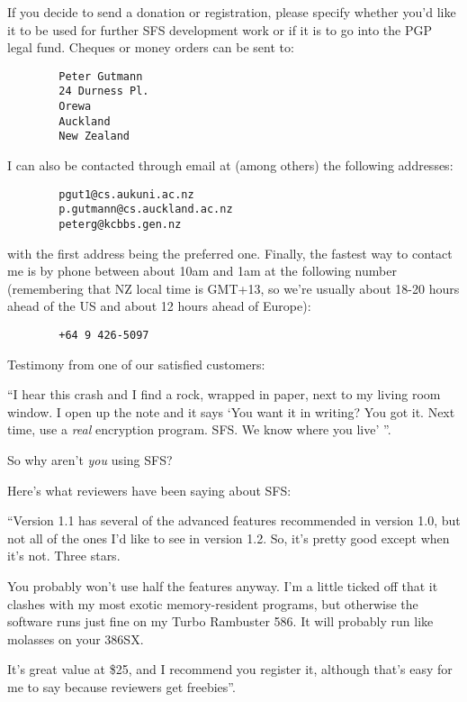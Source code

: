 If you decide to send a donation or registration, please specify whether you'd
like it to be used for further SFS development work or if it is to go into the
PGP legal fund.  Cheques or money orders can be sent to:

\begin{verbatim}
        Peter Gutmann
        24 Durness Pl.
        Orewa
        Auckland
        New Zealand
\end{verbatim}

I can also be contacted through email at (among others) the following
addresses:

\begin{verbatim}
        pgut1@cs.aukuni.ac.nz
        p.gutmann@cs.auckland.ac.nz
        peterg@kcbbs.gen.nz
\end{verbatim}

with the first address being the preferred one.  Finally, the fastest way to
contact me is by phone between about 10am and 1am at the following number
(remembering that NZ local time is GMT+13, so we're usually about 18-20 hours
ahead of the US and about 12 hours ahead of Europe):

\begin{verbatim}
        +64 9 426-5097
\end{verbatim}


Testimony from one of our satisfied customers:

``I hear this crash and I find a rock, wrapped in paper, next to my living room
  window.  I open up the note and it says `You want it in writing? You got it.
  Next time, use a {\em real} encryption program.  SFS.  We know where you live' ''.

  So why aren't {\em you} using SFS?

Here's what reviewers have been saying about SFS:

``Version 1.1 has several of the advanced features recommended in version 1.0,
  but not all of the ones I'd like to see in version 1.2.  So, it's pretty good
  except when it's not.  Three stars.

  You probably won't use half the features anyway.  I'm a little ticked off
  that it clashes with my most exotic memory-resident programs, but otherwise
  the software runs just fine on my Turbo Rambuster 586.  It will probably run
  like molasses on your 386SX.

  It's great value at \$25, and I recommend you register it, although that's
  easy for me to say because reviewers get freebies''.


